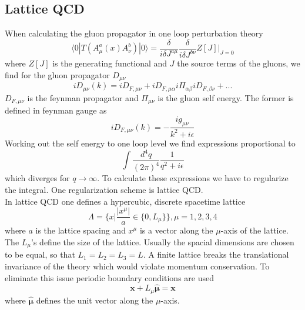 \subsection{Lattice QCD}
	When calculating the gluon propagator in one loop perturbation theory \cite{qcd2_script_philipsen}
	\begin{equation}
	    \langle 0|T(A^a_\mu(x)A^b_\nu)|0\rangle = \frac{\delta}{i\delta J^{a\mu}} \frac{\delta}{i\delta J^{b\nu}} Z[J]\Big|_{J=0}
	\end{equation}
	where $Z[J]$ is the generating functional and $J$ the source terms of the gluons, we find for the gluon propagator $D_{\mu\nu}$
	\begin{equation}
	    i D_{\mu\nu}(k) = i D_{F,\mu\nu} + i D_{F,\mu\alpha} i\Pi_{\alpha\beta} i D_{F,\beta\nu} + ...
	\end{equation}
	$D_{F,\mu\nu}$ is the feynman propagator and $\Pi_{\mu\nu}$ is the gluon self energy. The former is defined in feynman gauge as
	\begin{equation}
	    iD_{F,\mu\nu}(k) = -\frac{ig_{\mu\nu}}{k^2+i\epsilon}
	\end{equation}
	Working out the self energy to one loop level we find expressions proportional to
	\begin{equation}
	    \int\frac{d^4q}{(2\pi)^4}\frac{1}{q^2+i\epsilon}
	\end{equation}
	which diverges for $q\rightarrow\infty$. To calculate these expressions we have to regularize the integral. One regularization scheme is lattice QCD.\\
	
	\noindent
	In lattice QCD one defines a hypercubic, discrete spacetime lattice
	\begin{equation}
	    \Lambda = \{x|\frac{|x^\mu|}{a} \in \{0,L_\mu\}\}, \mu = 1,2,3,4
	\end{equation}
    where $a$ is the lattice spacing and $x^\mu$ is a vector along the $\mu$-axis of the lattice. The $L_\mu$'s define the size of the lattice. Usually the spacial dimensions are chosen to be equal, so that $L_1 = L_2 = L_3 = L$. A finite lattice breaks the translational invariance of the theory which would violate momentum conservation. To eliminate this issue periodic boundary conditions are used
    \begin{equation}
        \textbf{x} + L_\mu \hat{\boldsymbol{\mu}} = \textbf{x}
    \end{equation}
    where $\hat{\boldsymbol{\mu}}$ defines the unit vector along the $\mu$-axis.\\
    
